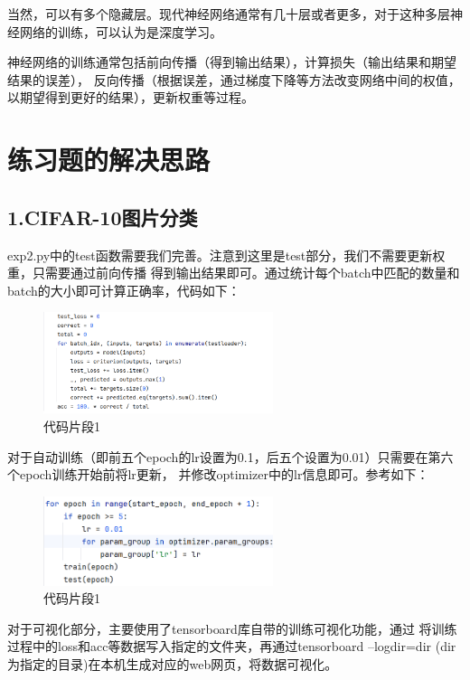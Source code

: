 \documentclass{article}
\begin{document}
    当然，可以有多个隐藏层。现代神经网络通常有几十层或者更多，对于这种多层神经网络的训练，可以认为是深度学习。

    神经网络的训练通常包括前向传播（得到输出结果），计算损失（输出结果和期望结果的误差），
    反向传播（根据误差，通过梯度下降等方法改变网络中间的权值，以期望得到更好的结果），更新权重等过程。

\section{练习题的解决思路}

\subsection{1.CIFAR-10图片分类}

    exp2.py中的test函数需要我们完善。注意到这里是test部分，我们不需要更新权重，只需要通过前向传播
    得到输出结果即可。通过统计每个batch中匹配的数量和batch的大小即可计算正确率，代码如下：

\begin{figure}[h]
\centering
\includegraphics[width=0.6\textwidth]{figure/prog_1}
\caption{代码片段1}
\end{figure}

    对于自动训练（即前五个epoch的lr设置为0.1，后五个设置为0.01）只需要在第六个epoch训练开始前将lr更新，
    并修改optimizer中的lr信息即可。参考如下：

\begin{figure}[h]
\centering
\includegraphics[width=0.6\textwidth]{figure/prog_2}
\caption{代码片段1}
\end{figure}

    对于可视化部分，主要使用了tensorboard库自带的训练可视化功能，通过
    将训练过程中的loss和acc等数据写入指定的文件夹，再通过tensorboard --logdir=dir
    (dir为指定的目录)在本机生成对应的web网页，将数据可视化。
\end{document}
